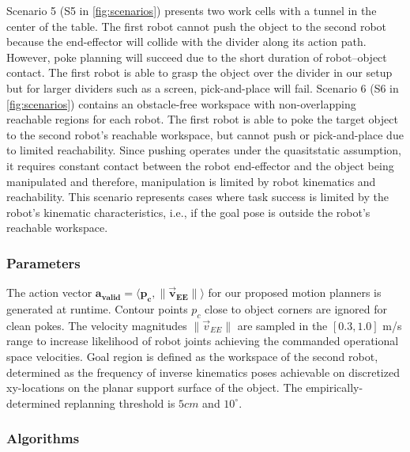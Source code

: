 Scenario 5 (S5 in \cref{fig:scenarios}) presents two work cells with a tunnel in the center of the table. The first robot cannot push the object to the second robot because the end-effector will collide with the divider along its action path. However, poke planning will succeed due to the short duration of robot--object contact. The first robot is able to grasp the object over the divider in our setup but for larger dividers such as a screen, pick-and-place will fail.
Scenario 6 (S6 in \cref{fig:scenarios}) contains an obstacle-free workspace with non-overlapping reachable regions for each robot. The first robot is able to poke the target object to the second robot's reachable workspace, but cannot push or pick-and-place due to limited reachability. Since pushing operates under the quasitstatic assumption, it requires constant contact between the robot end-effector and the object being manipulated and therefore, manipulation is limited by robot kinematics and reachability. This scenario represents cases where task success is limited by the robot's kinematic characteristics, i.e., if the goal pose is outside the robot's reachable workspace.

\subsubsection{Parameters}

The action vector $\boldsymbol{a_{valid}} = \langle \boldsymbol{p_c}, \boldsymbol{\|\vec{v}_{EE}\|}\rangle$ for our proposed motion planners is generated at runtime. Contour points $p_c$ close to object corners are ignored for clean pokes. The velocity magnitudes $\|\vec{v}_{EE}\|$ are sampled in the $[0.3, 1.0]$ m/s range to increase likelihood of robot joints achieving the commanded operational space velocities. Goal region is defined as the workspace of the second robot, determined as the frequency of inverse kinematics poses achievable on discretized xy-locations on the planar support surface of the object. The empirically-determined replanning threshold is $5cm$ and $10^{\circ}$.

\subsubsection{Algorithms}


